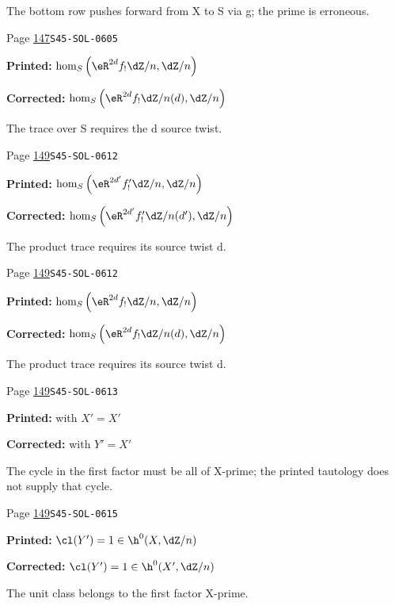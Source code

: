 \begin{description}
\par\noindent The bottom row pushes forward from X to S via g; the prime is erroneous.
\smallskip
\item[\hypertarget{apparatus:EN-0078}{78}] Page \hyperlink{printpage:en:147}{147}\quad\texttt{S45-SOL-0605}
\par\noindent\textbf{Printed:} \(\hom_S\left(\eR^{2 d} f_!\dZ/n,\dZ/n\right)\)
\par\noindent\textbf{Corrected:} \(\hom_S\left(\eR^{2 d} f_!\dZ/n(d),\dZ/n\right)\)
\par\noindent The trace over S requires the d source twist.
\smallskip
\item[\hypertarget{apparatus:EN-0079}{79}] Page \hyperlink{printpage:en:149}{149}\quad\texttt{S45-SOL-0612}
\par\noindent\textbf{Printed:} \(\hom_S\left(\eR^{2 d'} f_!' \dZ/n,\dZ/n\right)\)
\par\noindent\textbf{Corrected:} \(\hom_S\left(\eR^{2 d'} f_!' \dZ/n(d'),\dZ/n\right)\)
\par\noindent The product trace requires its source twist d.
\smallskip
\item[\hypertarget{apparatus:EN-0080}{80}] Page \hyperlink{printpage:en:149}{149}\quad\texttt{S45-SOL-0612}
\par\noindent\textbf{Printed:} \(\hom_S\left(\eR^{2 d}f_!\dZ/n,\dZ/n\right)\)
\par\noindent\textbf{Corrected:} \(\hom_S\left(\eR^{2 d}f_!\dZ/n(d),\dZ/n\right)\)
\par\noindent The product trace requires its source twist d.
\smallskip
\item[\hypertarget{apparatus:EN-0081}{81}] Page \hyperlink{printpage:en:149}{149}\quad\texttt{S45-SOL-0613}
\par\noindent\textbf{Printed:} with $X'=X'$
\par\noindent\textbf{Corrected:} with $Y'=X'$
\par\noindent The cycle in the first factor must be all of X-prime; the printed tautology does not supply that cycle.
\smallskip
\item[\hypertarget{apparatus:EN-0082}{82}] Page \hyperlink{printpage:en:149}{149}\quad\texttt{S45-SOL-0615}
\par\noindent\textbf{Printed:} \(\cl(Y')=1\in \h^0(X,\dZ/n)\)
\par\noindent\textbf{Corrected:} \(\cl(Y')=1\in \h^0(X',\dZ/n)\)
\par\noindent The unit class belongs to the first factor X-prime.
\smallskip

\end{description}
